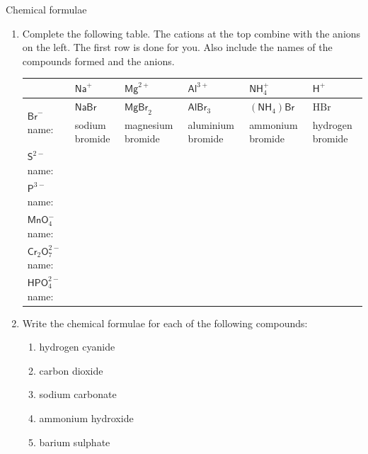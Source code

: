             \begin{exercises}{Chemical formulae
        }
            \nopagebreak
        \label{m38689*id145052}\begin{enumerate}[noitemsep, label=\textbf{\arabic*}. ] 
            \label{m38689*uid100}\item 
Complete the following table. The cations at the top combine with the anions on the left. The first row is done for you. Also include the names of the compounds formed and the anions.
          \begin{table}[H]
        \begin{center}
      \label{m38689*id145067}
    \noindent
      \begin{tabular}{|p{1cm}|p{2.5cm}|p{2.5cm}|p{2.5cm}|p{2.5cm}|p{2.5cm}|}\hline
        & $\mathsf{Na}^{+}$ & $\mathsf{Mg}^{2+}$ & $\mathsf{Al}^{3+}$ & $\mathsf{NH}_{4}^{+}$ & $\mathsf{H}^{+}$ \\ \hline
\multirow{2}{1cm}{$\mathsf{Br}^{-}$ name:} & $\mathsf{NaBr}$  & $\mathsf{MgBr}_2$  & $\mathsf{AlBr}_3$  & $(\mathsf{NH}_{4})\mathsf{Br}$  & $\mathrm{HBr}$  \\ 
 & sodium bromide & magnesium bromide & aluminium bromide & ammonium bromide & hydrogen bromide \\ \hline
$\mathsf{S}^{2-}$ name: & & & & & \\ \hline
$\mathsf{P}^{3-}$ name: & & & & & \\ \hline
$\mathsf{MnO}_{4}^{-}$ name: & & & & & \\ \hline
$\mathsf{Cr}_{2}\mathsf{O}_{7}^{2-}$ name: & & & & & \\ \hline
$\mathsf{HPO}_{4}^{2-}$ name: & & & & & \\ \hline
    \end{tabular}
      \end{center}
\end{table}
    \par
          \label{m38689*uid101}\item Write the chemical formulae for each of the following compounds:
\label{m38689*id145444}\begin{enumerate}[noitemsep, label=\textbf{\alph*}. ] 
            \label{m38689*uid102}\item hydrogen cyanide
\label{m38689*uid103}\item carbon dioxide
\label{m38689*uid104}\item sodium carbonate
\label{m38689*uid105}\item ammonium hydroxide
\label{m38689*uid106}\item barium sulphate

\end{enumerate}
\end{enumerate}
\end{exercises}
